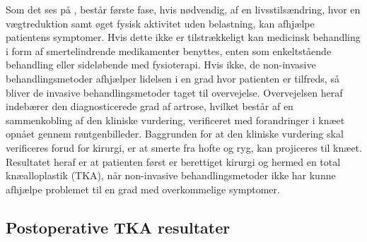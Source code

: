 Som det ses på , består første fase, hvis nødvendig, af en livsstilsændring, hvor en vægtreduktion samt øget fysisk aktivitet uden belastning, kan afhjælpe patientens symptomer. Hvis dette ikke er tilstrækkeligt kan medicinsk behandling i form af smertelindrende medikamenter benyttes, enten som enkeltstående behandling eller sideløbende med fysioterapi. Hvis ikke, de non-invasive behandlingsmetoder afhjælper lidelsen i en grad hvor patienten er tilfreds, så bliver de invasive behandlingsmetoder taget til overvejelse. Overvejelsen heraf indebærer den diagnosticerede grad af artrose, hvilket består af en sammenkobling af den kliniske vurdering, verificeret med forandringer i knæet opnået gennem røntgenbilleder. Baggrunden for at den kliniske vurdering skal verificeres forud for kirurgi, er at smerte fra hofte og ryg, kan projiceres til knæet. Resultatet heraf er at patienten først er berettiget kirurgi og hermed en total knæalloplastik (TKA), når non-invasive behandlingsmetoder ikke har kunne afhjælpe problemet til en grad med overkommelige symptomer. \citep{Lind2016b} \citep{brostrom2012} \citep{skou2016}


\subsection{Postoperative TKA resultater}


